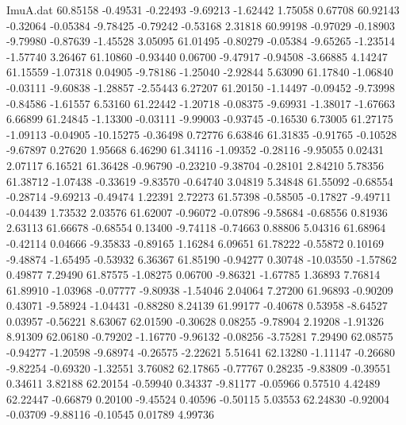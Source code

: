 \begin{filecontents}{ImuA.dat}
  60.85158   -0.49531   -0.22493   -9.69213   -1.62442    1.75058    0.67708
  60.92143   -0.32064   -0.05384   -9.78425   -0.79242   -0.53168    2.31818
  60.99198   -0.97029   -0.18903   -9.79980   -0.87639   -1.45528    3.05095
  61.01495   -0.80279   -0.05384   -9.65265   -1.23514   -1.57740    3.26467
  61.10860   -0.93440    0.06700   -9.47917   -0.94508   -3.66885    4.14247
  61.15559   -1.07318    0.04905   -9.78186   -1.25040   -2.92844    5.63090
  61.17840   -1.06840   -0.03111   -9.60838   -1.28857   -2.55443    6.27207
  61.20150   -1.14497   -0.09452   -9.73998   -0.84586   -1.61557    6.53160
  61.22442   -1.20718   -0.08375   -9.69931   -1.38017   -1.67663    6.66899
  61.24845   -1.13300   -0.03111   -9.99003   -0.93745   -0.16530    6.73005
  61.27175   -1.09113   -0.04905  -10.15275   -0.36498    0.72776    6.63846
  61.31835   -0.91765   -0.10528   -9.67897    0.27620    1.95668    6.46290
  61.34116   -1.09352   -0.28116   -9.95055    0.02431    2.07117    6.16521
  61.36428   -0.96790   -0.23210   -9.38704   -0.28101    2.84210    5.78356
  61.38712   -1.07438   -0.33619   -9.83570   -0.64740    3.04819    5.34848
  61.55092   -0.68554   -0.28714   -9.69213   -0.49474    1.22391    2.72273
  61.57398   -0.58505   -0.17827   -9.49711   -0.04439    1.73532    2.03576
  61.62007   -0.96072   -0.07896   -9.58684   -0.68556    0.81936    2.63113
  61.66678   -0.68554    0.13400   -9.74118   -0.74663    0.88806    5.04316
  61.68964   -0.42114    0.04666   -9.35833   -0.89165    1.16284    6.09651
  61.78222   -0.55872    0.10169   -9.48874   -1.65495   -0.53932    6.36367
  61.85190   -0.94277    0.30748  -10.03550   -1.57862    0.49877    7.29490
  61.87575   -1.08275    0.06700   -9.86321   -1.67785    1.36893    7.76814
  61.89910   -1.03968   -0.07777   -9.80938   -1.54046    2.04064    7.27200
  61.96893   -0.90209    0.43071   -9.58924   -1.04431   -0.88280    8.24139
  61.99177   -0.40678    0.53958   -8.64527    0.03957   -0.56221    8.63067
  62.01590   -0.30628    0.08255   -9.78904    2.19208   -1.91326    8.91309
  62.06180   -0.79202   -1.16770   -9.96132   -0.08256   -3.75281    7.29490
  62.08575   -0.94277   -1.20598   -9.68974   -0.26575   -2.22621    5.51641
  62.13280   -1.11147   -0.26680   -9.82254   -0.69320   -1.32551    3.76082
  62.17865   -0.77767    0.28235   -9.83809   -0.39551    0.34611    3.82188
  62.20154   -0.59940    0.34337   -9.81177   -0.05966    0.57510    4.42489
  62.22447   -0.66879    0.20100   -9.45524    0.40596   -0.50115    5.03553
  62.24830   -0.92004   -0.03709   -9.88116   -0.10545    0.01789    4.99736

\end{filecontents}

